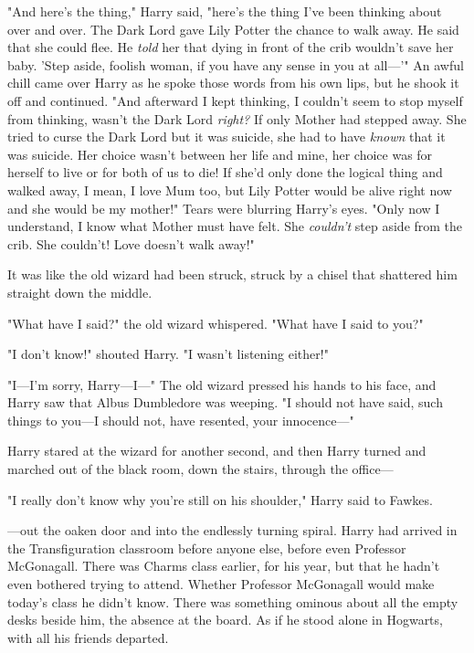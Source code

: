 "And here's the thing," Harry said, "here's the thing I've been thinking about 
over and over. The Dark Lord gave Lily Potter the chance to walk away. He said 
that she could flee. He \emph{told} her that dying in front of the crib 
wouldn't save her baby. 'Step aside, foolish woman, if you have any sense in 
you at all---'" An awful chill came over Harry as he spoke those words from his 
own lips, but he shook it off and continued. "And afterward I kept thinking, I 
couldn't seem to stop myself from thinking, wasn't the Dark Lord \emph{right?} 
If only Mother had stepped away. She tried to curse the Dark Lord but it was 
suicide, she had to have \emph{known} that it was suicide. Her choice wasn't 
between her life and mine, her choice was for herself to live or for both of us 
to die! If she'd only done the logical thing and walked away, I mean, I love 
Mum too, but Lily Potter would be alive right now and she would be my mother!" 
Tears were blurring Harry's eyes. "Only now I understand, I know what Mother 
must have felt. She \emph{couldn't} step aside from the crib. She couldn't! 
Love doesn't walk away!"

It was like the old wizard had been struck, struck by a chisel that shattered 
him straight down the middle.

"What have I said?" the old wizard whispered. "What have I said to you?"

"I don't know!" shouted Harry. "I wasn't listening either!"

"I---I'm sorry, Harry---I---" The old wizard pressed his hands to his face, and 
Harry saw that Albus Dumbledore was weeping. "I should not have said, such 
things to you---I should not, have resented, your innocence---"

Harry stared at the wizard for another second, and then Harry turned and 
marched out of the black room, down the stairs, through the office---

"I really don't know why you're still on his shoulder," Harry said to Fawkes.

---out the oaken door and into the endlessly turning spiral.
\sbreak
Harry had arrived in the Transfiguration classroom before anyone else, before 
even Professor McGonagall. There was Charms class earlier, for his year, but 
that he hadn't even bothered trying to attend. Whether Professor McGonagall 
would make today's class he didn't know. There was something ominous about all 
the empty desks beside him, the absence at the board. As if he stood alone in 
Hogwarts, with all his friends departed.

